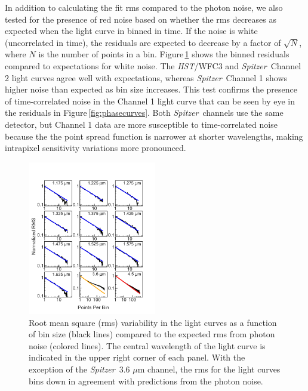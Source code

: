 \documentclass[twocolumn]{aastex61}
\newcommand{\project}[1]{\textsl{#1}}
\newcommand{\HST}{\project{HST}}
\newcommand{\Spitzer}{\project{Spitzer}}
\begin{document}

In addition to calculating the fit rms compared to the photon noise, we also tested for the presence of red noise based on whether the rms decreases as expected when the light curve in binned in time.  If the noise is white (uncorrelated in time), the residuals are expected to decrease by a factor of $\sqrt{N}$, where $N$ is the number of points in a bin. Figure\,\ref{fig:rms} shows the binned residuals compared to expectations for white noise. The \HST/WFC3 and \Spitzer\ Channel 2 light curves agree well with expectations, whereas \Spitzer\ Channel 1 shows higher noise than expected as bin size increases. This test confirms the presence of time-correlated noise in the Channel 1 light curve that can be seen by eye in the residuals in Figure\,\ref{fig:phasecurves}. Both \Spitzer\ channels use the same detector, but Channel 1 data are more susceptible to time-correlated noise because the the point spread function is narrower at shorter wavelengths, making intrapixel sensitivity variations more pronounced.


\begin{figure}
\includegraphics[width = 0.5\textwidth]{Figures/rms.pdf}
\caption{Root mean square (rms) variability in the light curves as a function of bin size (black lines) compared to the expected rms from photon noise (colored lines). The central wavelength of the light curve is indicated in the upper right corner of each panel. With the exception of the \Spitzer\ 3.6 $\mu$m channel, the rms for the light curves bins down in agreement with predictions from the photon noise.}
\label{fig:rms}
\end{figure}
\end{document}
